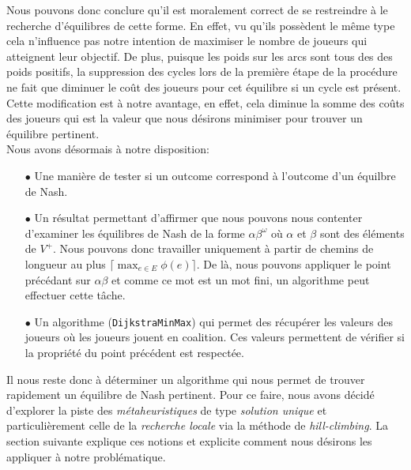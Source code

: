 Nous pouvons donc conclure qu'il est moralement correct de se restreindre à le recherche d'équilibres de cette forme. En effet, vu qu'ils possèdent le même type cela n'influence pas notre intention de maximiser le nombre de joueurs qui atteignent leur objectif. De plus, puisque les poids sur les arcs sont tous des des poids positifs, la suppression des cycles lors de la première étape de la procédure ne fait que diminuer le coût des joueurs pour cet équilibre si un cycle est présent. Cette modification est à notre avantage, en effet, cela diminue la somme des coûts des joueurs qui est la valeur que nous désirons minimiser pour trouver un équilibre pertinent.\\

Nous avons désormais à notre disposition:
\begin{itemize}
	\item[$\bullet$] Une manière de tester si un outcome correspond à l'outcome d'un équilbre de Nash.
	\item[$\bullet$] Un résultat permettant d'affirmer que nous pouvons nous contenter d'examiner les équilibres de Nash de la forme $\alpha \beta^{\omega}$ où $\alpha$ et $\beta$ sont des éléments de $V^{+}$. Nous pouvons donc travailler uniquement à partir de chemins de longueur au plus $\lceil \max_{e \in E} \phi(e) \rceil$. De là, nous pouvons appliquer le point précédant sur $\alpha\beta$ et comme ce mot est un mot fini, un algorithme peut effectuer cette tâche. 
	\item[$\bullet$] Un algorithme (\verb|DijkstraMinMax|) qui permet des récupérer les valeurs des joueurs où les joueurs jouent en coalition. Ces valeurs permettent de vérifier si la propriété du point précédent est respectée.
\end{itemize}
Il nous reste donc à déterminer un algorithme qui nous permet de trouver rapidement un équilibre de Nash pertinent. Pour ce faire, nous avons décidé d'explorer la piste des \emph{métaheuristiques} de type \emph{solution unique} et particulièrement celle de la \emph{recherche locale} via la méthode de \emph{hill-climbing}. La section suivante explique ces notions et explicite comment nous désirons les appliquer à notre problématique.\\







